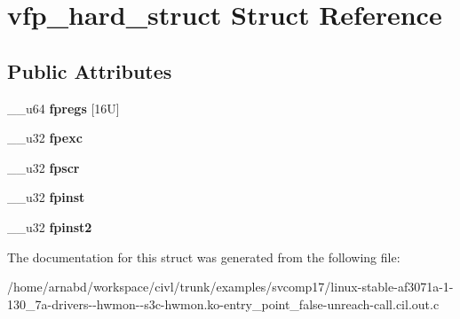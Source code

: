 \hypertarget{structvfp__hard__struct}{}\section{vfp\+\_\+hard\+\_\+struct Struct Reference}
\label{structvfp__hard__struct}
\subsection*{Public Attributes}
\begin{DoxyCompactItemize}
\item 
\hypertarget{structvfp__hard__struct_ab16ff26170116931b27b0dfe95bce44c}{}\+\_\+\+\_\+u64 {\bfseries fpregs} \mbox{[}16\+U\mbox{]}\label{structvfp__hard__struct_ab16ff26170116931b27b0dfe95bce44c}

\item 
\hypertarget{structvfp__hard__struct_a9be6eb11fab96c22e5bf62c390b79528}{}\+\_\+\+\_\+u32 {\bfseries fpexc}\label{structvfp__hard__struct_a9be6eb11fab96c22e5bf62c390b79528}

\item 
\hypertarget{structvfp__hard__struct_a9528d797013b97910044f34e6abd34bf}{}\+\_\+\+\_\+u32 {\bfseries fpscr}\label{structvfp__hard__struct_a9528d797013b97910044f34e6abd34bf}

\item 
\hypertarget{structvfp__hard__struct_a8a39221963975e483e60eb7c6f6599f8}{}\+\_\+\+\_\+u32 {\bfseries fpinst}\label{structvfp__hard__struct_a8a39221963975e483e60eb7c6f6599f8}

\item 
\hypertarget{structvfp__hard__struct_a08bb2a139ff0df5538d7a79d90ebd8ba}{}\+\_\+\+\_\+u32 {\bfseries fpinst2}\label{structvfp__hard__struct_a08bb2a139ff0df5538d7a79d90ebd8ba}

\end{DoxyCompactItemize}


The documentation for this struct was generated from the following file\+:\begin{DoxyCompactItemize}
\item 
/home/arnabd/workspace/civl/trunk/examples/svcomp17/linux-\/stable-\/af3071a-\/1-\/130\+\_\+7a-\/drivers-\/-\/hwmon-\/-\/s3c-\/hwmon.\+ko-\/entry\+\_\+point\+\_\+false-\/unreach-\/call.\+cil.\+out.\+c\end{DoxyCompactItemize}
